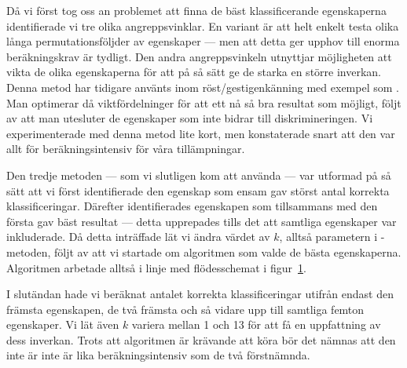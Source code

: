 \documentclass[../rapport_MVEX01-11-05]{subfiles}
\begin{document}
Då vi först tog oss an problemet att finna de bäst klassificerande
egenskaperna identifierade vi tre olika angreppsvinklar. En variant är att helt
enkelt testa olika långa permutationsföljder av egenskaper ---
men att detta ger upphov till enorma beräkningskrav är tydligt. 
Den andra angreppsvinkeln utnyttjar
möjligheten att vikta de olika egenskaperna för att på så sätt ge de starka en
större inverkan. Denna metod har tidigare använts inom
röst/gestigenkänning med exempel som . Man optimerar då
viktfördelninger för att ett nå så bra resultat som möjligt, följt av att man
utesluter de egenskaper som inte bidrar till diskrimineringen. Vi experimenterade
med denna metod lite kort, men konstaterade snart att den var allt för 
beräkningsintensiv för våra tillämpningar.

Den tredje metoden --- som vi slutligen kom att
använda --- var utformad på så sätt att vi först identifierade den egenskap som
ensam gav störst antal korrekta klassificeringar. Därefter identifierades
egenskapen som tillsammans med den första gav bäst resultat --- detta
upprepades tills det att samtliga egenskaper var inkluderade. Då detta
inträffade lät vi ändra värdet av $k$, alltså parametern i \knn-metoden, följt av
att vi startade om algoritmen som valde de bästa egenskaperna. Algoritmen
arbetade alltså i linje med flödesschemat i figur~\ref{fig:knn-flowchart}. 

\begin{figure}[tbp]
	\centering 
	\caption{}
	\label{fig:knn-flowchart}
\end{figure}

I slutändan hade vi beräknat antalet korrekta klassificeringar utifrån
endast den främsta egenskapen, de två främsta och så vidare upp till
samtliga femton egenskaper. Vi lät även $k$ variera mellan 1 och 13 för att få
en uppfattning av dess inverkan. Trots att algoritmen är krävande att köra bör
det nämnas att den inte är inte är lika beräkningsintensiv som de två
förstnämnda. 
\end{document}
